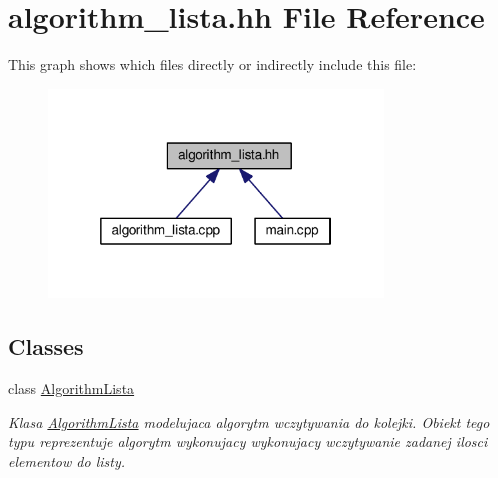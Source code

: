 \hypertarget{algorithm__lista_8hh}{\section{algorithm\-\_\-lista.\-hh File Reference}
\label{algorithm__lista_8hh}
}
This graph shows which files directly or indirectly include this file\-:\nopagebreak
\begin{figure}[H]
\begin{center}
\leavevmode
\includegraphics[width=252pt]{algorithm__lista_8hh__dep__incl}
\end{center}
\end{figure}
\subsection*{Classes}
\begin{DoxyCompactItemize}
\item 
class \hyperlink{class_algorithm_lista}{Algorithm\-Lista}
\begin{DoxyCompactList}\small\item\em Klasa \hyperlink{class_algorithm_lista}{Algorithm\-Lista} modelujaca algorytm wczytywania do kolejki. Obiekt tego typu reprezentuje algorytm wykonujacy wykonujacy wczytywanie zadanej ilosci elementow do listy. \end{DoxyCompactList}\end{DoxyCompactItemize}
